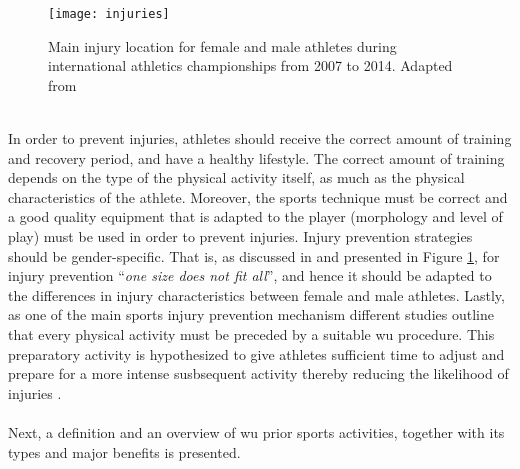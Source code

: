 \begin{figure}[h]
    \centering
    \texttt{[image: injuries]}
    \caption[Main injury location for female and male athletes ]{Main injury location for female and male athletes during
international athletics championships from 2007 to 2014. Adapted from \cite{mayr2015prevention}}
    \label{fig:injuries}
\end{figure}\\
In order to prevent injuries, athletes should receive the correct amount of training and recovery period, and have a healthy lifestyle. The correct amount of training depends on the type of the physical activity itself, as much as the physical characteristics of the athlete. Moreover, the sports technique must be correct and a good quality equipment that is adapted to the player (morphology and level of play) must be used in order to prevent injuries. Injury prevention strategies should be gender-specific. That is, as discussed in \cite{edouard2015sex} and presented in Figure \ref{fig:injuries}, for injury prevention ``\textit{one size does not fit all}'', and hence it should be adapted to the differences in injury characteristics between female and male athletes. Lastly, as one of the main sports injury prevention mechanism different studies outline that every physical activity must be preceded by a suitable \acrshort{wu} procedure. This preparatory activity is hypothesized to give athletes sufficient time to adjust and prepare for a more intense susbsequent activity thereby reducing the likelihood of injuries \cite{mayr2015prevention}.\\\\ Next, a definition and an overview of \acrshort{wu} prior sports activities, together with its types and major benefits is presented.\pagebreak %
